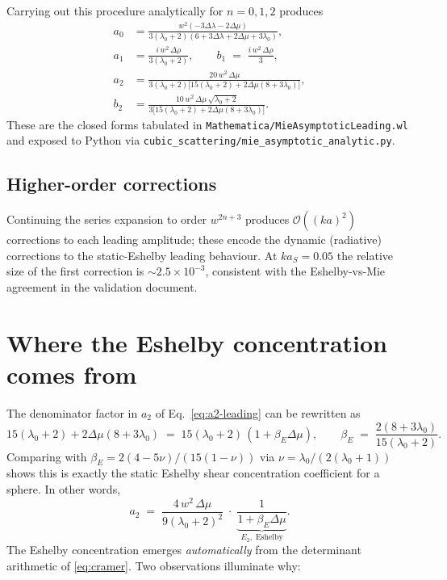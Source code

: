\documentclass[11pt,a4paper]{article}
\newcommand{\D}{\Delta}
\newcommand{\order}{\mathcal{O}}
\newcommand{\code}[1]{\texttt{#1}}
\begin{document}
Carrying out this procedure analytically for $n=0,1,2$ produces
\begin{align}
a_0 &= \frac{w^2(-3\D\lambda-2\D\mu)}{3(\lambda_0+2)(6+3\D\lambda+2\D\mu+3\lambda_0)}, \\[4pt]
a_1 &= \frac{i\,w^2\,\D\rho}{3(\lambda_0+2)}, \qquad
b_1 \;=\; \frac{i\,w^2\,\D\rho}{3}, \\[4pt]
a_2 &= \frac{20\,w^2\,\D\mu}{3(\lambda_0+2)\bigl[15(\lambda_0+2)+2\D\mu(8+3\lambda_0)\bigr]},
\label{eq:a2-leading}\\[4pt]
b_2 &= \frac{10\,w^2\,\D\mu\,\sqrt{\lambda_0+2}}{3\bigl[15(\lambda_0+2)+2\D\mu(8+3\lambda_0)\bigr]}.
\end{align}
These are the closed forms tabulated in
\code{Mathematica/MieAsymptoticLeading.wl} and exposed to Python via
\code{cubic\_scattering/mie\_asymptotic\_analytic.py}.

\subsection*{Higher-order corrections}
Continuing the series expansion to order $w^{2n+3}$ produces
$\order((ka)^2)$ corrections to each leading amplitude; these encode
the dynamic (radiative) corrections to the static-Eshelby leading
behaviour.  At $ka_S=0.05$ the relative size of the first correction
is $\sim 2.5\times 10^{-3}$, consistent with the Eshelby-vs-Mie
agreement in the validation document.

\section{Where the Eshelby concentration comes from}
\label{sec:eshelby-emerges}

The denominator factor in $a_2$ of Eq.~\eqref{eq:a2-leading} can be
rewritten as
\begin{equation}
15(\lambda_0+2)+2\D\mu(8+3\lambda_0) \;=\; 15(\lambda_0+2)\,(1+\beta_E\D\mu),
\qquad
\beta_E \;=\; \frac{2(8+3\lambda_0)}{15(\lambda_0+2)}.
\label{eq:eshelby-emerges}
\end{equation}
Comparing with $\beta_E = 2(4-5\nu)/(15(1-\nu))$ via $\nu=\lambda_0/(2(\lambda_0+1))$
shows this is exactly the static Eshelby shear concentration
coefficient for a sphere.  In other words,
\begin{equation}
a_2 \;=\; \frac{4\,w^2\,\D\mu}{9(\lambda_0+2)^2}\;\cdot\;\underbrace{\frac{1}{1+\beta_E\D\mu}}_{E_2,\;\text{Eshelby}}.
\label{eq:a2-factored}
\end{equation}
The Eshelby concentration emerges \emph{automatically} from the
determinant arithmetic of \eqref{eq:cramer}.  Two observations
illuminate why:
\end{document}
